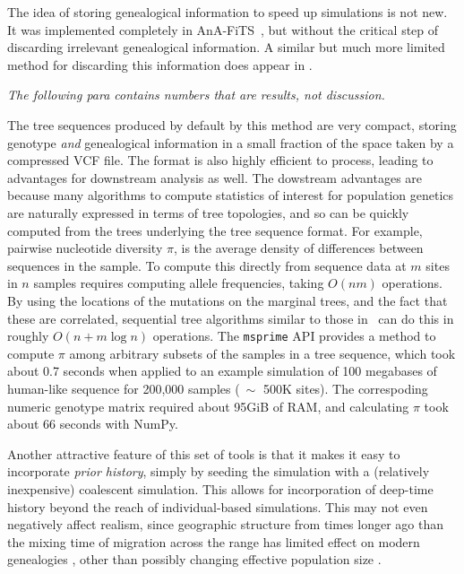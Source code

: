 \documentclass{article}
\newcommand{\msprime}{\texttt{msprime}}
\newcommand{\krt}[1]{{\em \color{green} #1}}
\begin{document}
The idea of storing genealogical information to speed up simulations is not new.
It was implemented completely in AnA-FiTS~\citep{aberer2013rapid},
but without the critical step of discarding irrelevant genealogical information.
A similar but much more limited method for
discarding this information does appear in \citet{padhukasahasram2008exploring}.


\krt{The following para contains numbers that are results, not discussion.}

The tree sequences produced by default by this method
are very compact, storing genotype \emph{and} genealogical information
in a small fraction of the space taken by a compressed VCF file.
The format is also highly efficient to process,
leading to advantages for downstream analysis as well.
The dowstream advantages are because many algorithms to compute statistics of interest for population genetics
are naturally expressed in terms of tree topologies,
and so can be quickly computed from the trees underlying the tree sequence format.
For example, pairwise nucleotide diversity $\pi$, is the average density of
differences between sequences in the sample.
To compute this directly from sequence data at $m$ sites in $n$ samples
requires computing allele frequencies, taking $O(nm)$ operations.
By using the locations of the mutations on the marginal trees,
and the fact that these are correlated,
sequential tree algorithms similar to those in~\citep{kelleher2016efficient}
can do this in roughly $O(n + m \log n)$ operations.
The \msprime{} API provides a method to compute $\pi$ among arbitrary subsets of the
samples in a tree sequence, which took about 0.7 seconds when
applied to an example simulation of 100 megabases of human-like
sequence for 200,000 samples ($~\sim$ 500K sites). The correspoding
numeric genotype matrix required about 95GiB of RAM, and
calculating $\pi$ took about 66 seconds with NumPy.


Another attractive feature of this set of tools
is that it makes it easy to incorporate \emph{prior history},
simply by seeding the simulation with a (relatively inexpensive) coalescent simulation.
This allows for incorporation of deep-time history beyond the reach of individual-based simulations.
This may not even negatively affect realism,
since geographic structure from times longer ago than the mixing
time of migration across the range has limited effect on modern genealogies
\citep{wilkins2004separation},
other than possibly changing effective population size \citep{barton2002neutral,cox2002stepping}.
\end{document}
